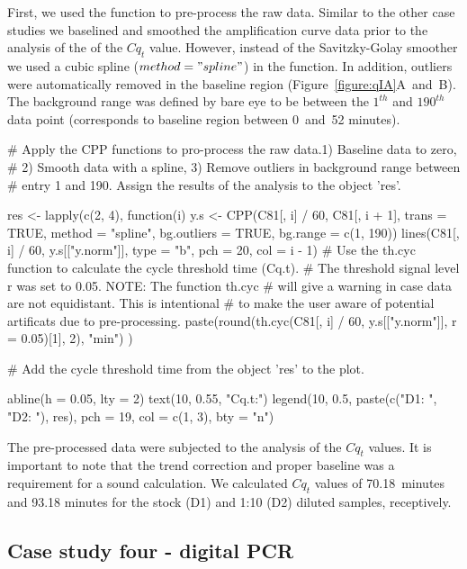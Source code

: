 First, we used the  function to pre-process the raw data. Similar to 
the other case studies we baselined and smoothed the amplification curve data 
prior to the analysis of the of the $Cq_{t}$ value. However, instead of the 
Savitzky-Golay smoother we used a cubic spline ($method = "spline"$) in the 
 function. In addition, outliers were automatically removed in the 
baseline region (Figure~\ref{figure:qIA}A~and~B). The background range was 
defined by bare eye to be between the $1^{th}$ and $190^{th}$ data point 
(corresponds to baseline region between 0~and~52 minutes). 

\begin{example}
# Apply the CPP functions to pro-process the raw data.1) Baseline data to zero, 
# 2) Smooth data with a spline, 3) Remove outliers in background range between 
# entry 1 and 190. Assign the results of the analysis to the object 'res'.

res <- lapply(c(2, 4), function(i) {
  y.s <- CPP(C81[, i] / 60, C81[, i + 1],
             trans = TRUE, 
             method = "spline",
             bg.outliers = TRUE,
             bg.range = c(1, 190))
  lines(C81[, i] / 60, y.s[["y.norm"]], type = "b", pch = 20, col = i - 1)
  # Use the th.cyc function to calculate the cycle threshold time (Cq.t). 
  # The threshold signal level r was set to 0.05. NOTE: The function th.cyc
  # will give a warning in case data are not equidistant. This is intentional
  # to make the user aware of potential artificats due to pre-processing.
  paste(round(th.cyc(C81[, i] / 60, y.s[["y.norm"]], r = 0.05)[1], 2), "min")
})

# Add the cycle threshold time from the object 'res' to the plot.

abline(h = 0.05, lty = 2)
text(10, 0.55, "Cq.t:")
legend(10, 0.5, paste(c("D1: ", "D2: "), res), pch = 19, col = c(1, 3), 
       bty = "n")
\end{example}

The pre-processed data were subjected to the analysis of the $Cq_{t}$ values. 
It is important to note that the trend correction and proper baseline was a 
requirement for a sound calculation. We calculated $Cq_{t}$ values of 
70.18~minutes and 93.18 minutes for the stock (D1) and 1:10 (D2) diluted 
samples, receptively.

\subsection{Case study four - digital PCR}

